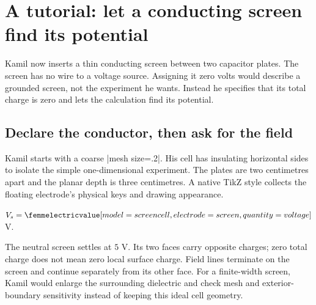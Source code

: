 \section{A tutorial: let a conducting screen find its potential}
\label{sec:tutorial-electric-floating}

Kamil now inserts a thin conducting screen between two capacitor plates. The
screen has no wire to a voltage source. Assigning it zero volts would describe
a grounded screen, not the experiment he wants. Instead he specifies that
its total charge is zero and lets the calculation find its potential.

\subsection{Declare the conductor, then ask for the field}
Kamil starts with a coarse |mesh size=.2|. His cell has insulating horizontal
sides to isolate the simple one-dimensional experiment. The plates are two
centimetres apart and the planar depth is three centimetres. A native TikZ
style collects the floating electrode's physical keys and drawing appearance.

\Needspace{12cm}
\begin{codeexample}[width=0pt]
\qquad
$V_s=\femmelectricvalue[model=screen cell,electrode=screen,
    quantity=voltage]$ V.
\end{codeexample}

The neutral screen settles at $5$ V. Its two faces carry opposite charges;
zero total charge does not mean zero local surface charge. Field lines terminate
on the screen and continue separately from its other face. For a finite-width
screen, Kamil would enlarge the surrounding dielectric and check mesh and
exterior-boundary sensitivity instead of keeping this ideal cell geometry.

